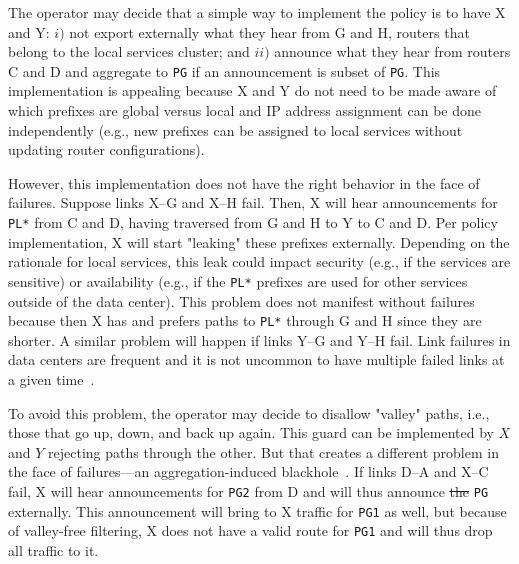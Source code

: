 \documentclass[10pt]{sigalternate052015} %
\newcommand{\CD}[1]{\texttt{\small #1}}  %
\providecommand{\DIFdel}[1]{{\protect\color{red}\sout{#1}}}                      %
\providecommand{\DIFdelbegin}{} %
\providecommand{\DIFdelend}{} %
\begin{document}
The operator may decide that a simple way to implement the policy is to have X and Y: $i)$ not export externally what they hear from G and H, routers that belong to the local services cluster; and $ii)$ announce what they hear from routers C and D and aggregate to \CD{PG} if an announcement is subset of \CD{PG}. This implementation is appealing because X and Y do not need to be made aware of which prefixes are global versus local and IP address assignment can be done independently (e.g., new prefixes can be assigned to local services without updating router configurations).


\DIFdelbegin %

\DIFdelend However, this implementation does not have the right behavior in the face of failures. Suppose links X--G and X--H fail. Then, X will hear announcements for \CD{PL*} from C and D, having traversed from G and H to Y to C and D. Per policy implementation, X will start "leaking" these prefixes externally. Depending on the rationale for local services, this leak could impact security (e.g., if the services are sensitive) or availability (e.g., if the \CD{PL*} prefixes are used for other services outside of the data center). This problem does not manifest without failures because then X has and prefers paths to \CD{PL*} through G and H since they are shorter. A similar problem will happen if links Y--G and Y--H fail.
Link failures in data centers are frequent and it is not uncommon to have multiple failed links at a given time~\cite{dc-failure-study}.

To avoid this problem, the operator may decide to disallow "valley" paths, i.e., those that go up, down, and back up again. This guard can be implemented by $X$ and $Y$ rejecting paths through the other. But that creates a different problem in the face of failures---an aggregation-induced blackhole~\cite{route-aggregation}. If links D--A and X--C fail, X will hear announcements for \CD{PG2} from D and will thus announce \DIFdelbegin \DIFdel{the }\DIFdelend \CD{PG} externally. This announcement will bring to X traffic for \CD{PG1} as well, but because of valley-free filtering, X does not have a valid route for \CD{PG1} and will thus drop all traffic to it.
\end{document}
